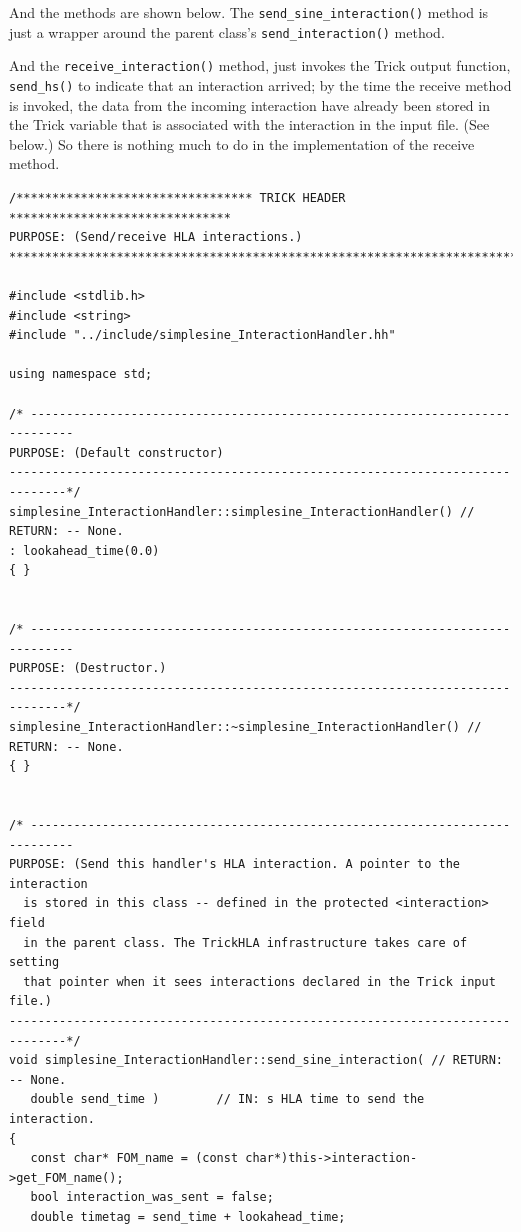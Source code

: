 And the methods are shown below.
The {\tt send\_sine\_interaction()} method is just a wrapper around the
parent class's {\tt send\_interaction()} method.

And the {\tt receive\_interaction()} method, just invokes the Trick
output function, {\tt send\_hs()} to indicate that an interaction arrived;
by the time the receive method is invoked,
the data from the incoming interaction have already been stored in the
Trick variable that is associated with the interaction in the input
file. (See below.)
So there is nothing much to do in the implementation of the receive method.

\begin{lstlisting}[caption={{\tt simplesine\_InteractionHandler} methods},label={list:simplesine-interaction-handler-methods}]
/********************************* TRICK HEADER *******************************
PURPOSE: (Send/receive HLA interactions.)
*******************************************************************************/

#include <stdlib.h>
#include <string>
#include "../include/simplesine_InteractionHandler.hh"

using namespace std;

/* ----------------------------------------------------------------------------
PURPOSE: (Default constructor)
------------------------------------------------------------------------------*/
simplesine_InteractionHandler::simplesine_InteractionHandler() // RETURN: -- None.
: lookahead_time(0.0)
{ }


/* ----------------------------------------------------------------------------
PURPOSE: (Destructor.)
------------------------------------------------------------------------------*/
simplesine_InteractionHandler::~simplesine_InteractionHandler() // RETURN: -- None.
{ }


/* ----------------------------------------------------------------------------
PURPOSE: (Send this handler's HLA interaction. A pointer to the interaction
  is stored in this class -- defined in the protected <interaction> field
  in the parent class. The TrickHLA infrastructure takes care of setting
  that pointer when it sees interactions declared in the Trick input file.)
------------------------------------------------------------------------------*/
void simplesine_InteractionHandler::send_sine_interaction( // RETURN: -- None.
   double send_time )        // IN: s HLA time to send the interaction.
{
   const char* FOM_name = (const char*)this->interaction->get_FOM_name();
   bool interaction_was_sent = false;
   double timetag = send_time + lookahead_time;


\end{lstlisting}
